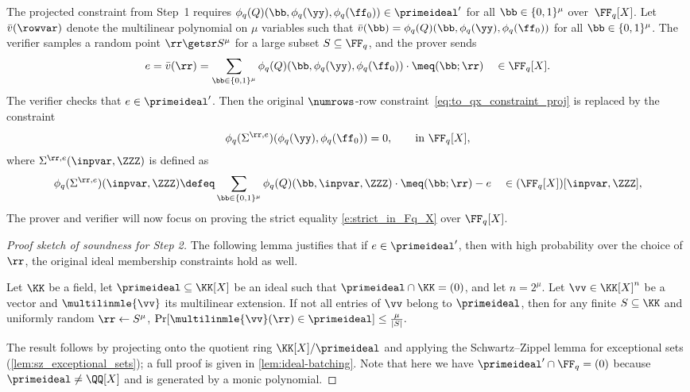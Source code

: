 The projected constraint from Step~1 requires $\phi_q(Q)(\bb, \phi_q(\yy),\phi_q(\ff_0))\in \primeideal'$ for all $\bb\in\{0,1\}^\mu$ over~$\FF_q[X]$. Let $\bar v(\rowvar)$ denote the multilinear polynomial on $\mu$ variables such that $\bar v(\bb) = \phi_q(Q)(\bb, \phi_q(\yy), \phi_q(\ff_0))$ for all $\bb \in \{0,1\}^\mu$. The verifier samples a random point $\rr\getsr S^\mu$ for a large subset $S\subseteq \FF_q$, and the prover sends
\[
e = \bar v(\rr) = \sum_{\bb\in\{0,1\}^\mu} \phi_q(Q)(\bb, \phi_q(\yy),\phi_q(\ff_0)) \cdot \meq(\bb;\rr) \quad \in \FF_q[X].
\]
The verifier checks that $e\in \primeideal'$. 
Then the original $\numrows$-row constraint~\eqref{eq:to_qx_constraint_proj} is replaced by the constraint  
\begin{equation}\label{e:strict_in_Fq_X}\phi_q(\Sigma^{\rr,e})(\phi_q(\yy), \phi_q(\ff_0))=0, \qquad \text{in }\FF_q[X],\end{equation} where $\Sigma^{\rr,e}(\inpvar, \ZZZ)$ is defined as
\[
\phi_q(\Sigma^{\rr,e})(\inpvar, \ZZZ) \defeq \sum_{\bb\in\{0,1\}^\mu}  \phi_q(Q)(\bb, \inpvar, \ZZZ)\cdot \meq(\bb;\rr) - e \quad \in (\FF_q[X])[\inpvar, \ZZZ],
\]
The prover and verifier will now focus on proving the strict equality \eqref{e:strict_in_Fq_X} over $\FF_q[X]$.


\begin{proof}[Proof sketch of soundness for Step 2]

The following lemma justifies that if $e\in \primeideal'$, then with high probability over the choice of $\rr$, the original ideal membership constraints hold as well.

\begin{lemma}
\label{lem:ideal_membership_mle_test}
Let $\KK$ be a field, let $\primeideal\subseteq \KK[X]$ be an ideal such that $\primeideal\cap \KK=(0)$, and let $n=2^\mu$.
Let $\vv\in\KK[X]^n$ be a vector and $\multilinmle{\vv}$ its multilinear extension.
If not all entries of $\vv$ belong to $\primeideal$, then for any finite $S\subseteq \KK$ and uniformly random $\rr \gets S^\mu$,
\(
\Pr[\multilinmle{\vv}(\rr) \in \primeideal] \le \frac{\mu}{|S|}.
\)
\end{lemma}
The result follows by projecting onto the quotient ring $\KK[X]/\primeideal$ and applying the Schwartz--Zippel lemma for exceptional sets (\cref{lem:sz_exceptional_sets}); a full proof is given in \cref{lem:ideal-batching}. 
Note that here we have $\primeideal'\cap \FF_q=(0)$ because $\primeideal \neq \QQ[X]$ and is generated by a monic polynomial. 
%
\end{proof}

